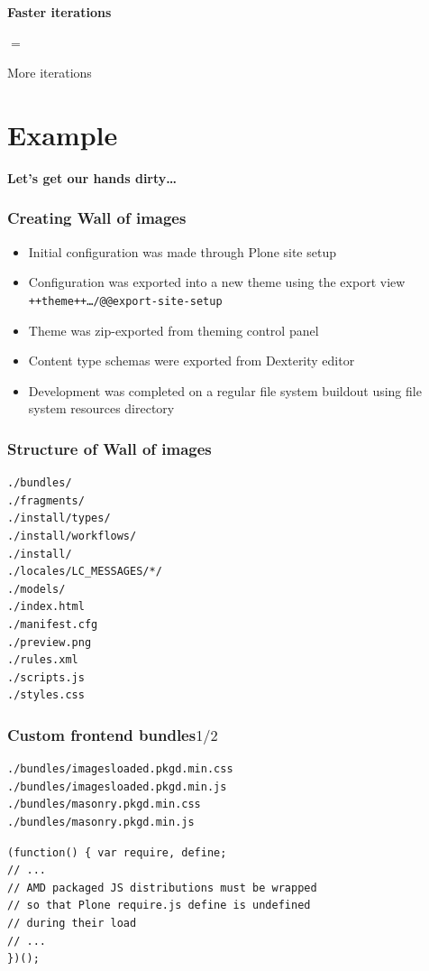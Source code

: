 \documentclass[aspectratio=43]{beamer}
\begin{document}
\begin{frame}[plain,t]
  \vspace{8em}
  \huge
  \bfseries
  \centering
  Faster iterations
  \par
  $=$
  \par
  More iterations
\end{frame}

\section{Example}

\begin{frame}[plain,c]
  \huge
  \bfseries
  \centering
  \vspace{1cm}
  Let's get our hands dirty\dots
\end{frame}

\begin{frame}[plain,t]
  \frametitle{Creating Wall of images}
  \begin{itemize}[<+->]
  \setlength{\itemsep}{1em}
  \item Initial configuration was made through Plone site setup
  \item Configuration was exported into a new theme using the export view
  \texttt{++theme++\ldots/@@export-site-setup}
  \item Theme was zip-exported from theming control panel
  \item Content type schemas were exported from Dexterity editor
  \item Development was completed on a regular file system buildout
  using file system resources directory
  \end{itemize}
\end{frame}

\begin{frame}
  \frametitle{Structure of Wall of images}
  \begin{verbatim}
./bundles/
./fragments/
./install/types/
./install/workflows/
./install/
./locales/LC_MESSAGES/*/
./models/
./index.html
./manifest.cfg
./preview.png
./rules.xml
./scripts.js
./styles.css
  \end{verbatim}
\end{frame}

\begin{frame}
\frametitle{Custom frontend bundles\hfill$1/2$}
\begin{verbatim}
./bundles/imagesloaded.pkgd.min.css
./bundles/imagesloaded.pkgd.min.js
./bundles/masonry.pkgd.min.css
./bundles/masonry.pkgd.min.js
\end{verbatim}
\vspace{\lineheight}
\begin{verbatim}
(function() { var require, define;
// ...
// AMD packaged JS distributions must be wrapped
// so that Plone require.js define is undefined
// during their load
// ...
})();
\end{verbatim}
\end{frame}
\end{document}
